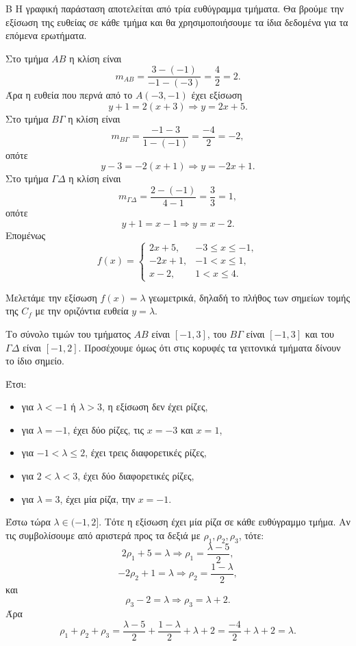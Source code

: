 
\begin{thema}{Β}
Η γραφική παράσταση αποτελείται από τρία ευθύγραμμα τμήματα. Θα βρούμε την εξίσωση της ευθείας σε κάθε τμήμα και θα χρησιμοποιήσουμε τα ίδια δεδομένα για τα επόμενα ερωτήματα.

\begin{erwthma}
\item Στο τμήμα $AB$ η κλίση είναι
\[
m_{AB}=\frac{3-(-1)}{-1-(-3)}=\frac{4}{2}=2.
\]
Άρα η ευθεία που περνά από το $A(-3,-1)$ έχει εξίσωση
\[
y+1=2(x+3)\Rightarrow y=2x+5.
\]
Στο τμήμα $B\Gamma$ η κλίση είναι
\[
m_{B\Gamma}=\frac{-1-3}{1-(-1)}=\frac{-4}{2}=-2,
\]
οπότε
\[
y-3=-2(x+1)\Rightarrow y=-2x+1.
\]
Στο τμήμα $\Gamma\Delta$ η κλίση είναι
\[
m_{\Gamma\Delta}=\frac{2-(-1)}{4-1}=\frac{3}{3}=1,
\]
οπότε
\[
y+1=x-1\Rightarrow y=x-2.
\]
Επομένως
\[
f(x)=
\begin{cases}
2x+5, & -3\leq x\leq -1,\\
-2x+1, & -1<x\leq 1,\\
x-2, & 1<x\leq 4.
\end{cases}
\]

\item Μελετάμε την εξίσωση $f(x)=\lambda$ γεωμετρικά, δηλαδή το πλήθος των σημείων τομής της $C_f$ με την οριζόντια ευθεία $y=\lambda$.

Το σύνολο τιμών του τμήματος $AB$ είναι $[-1,3]$, του $B\Gamma$ είναι $[-1,3]$ και του $\Gamma\Delta$ είναι $[-1,2]$. Προσέχουμε όμως ότι στις κορυφές τα γειτονικά τμήματα δίνουν το ίδιο σημείο.

Έτσι:
\begin{itemize}
\item για $\lambda<-1$ ή $\lambda>3$, η εξίσωση δεν έχει ρίζες,
\item για $\lambda=-1$, έχει δύο ρίζες, τις $x=-3$ και $x=1$,
\item για $-1<\lambda\leq 2$, έχει τρεις διαφορετικές ρίζες,
\item για $2<\lambda<3$, έχει δύο διαφορετικές ρίζες,
\item για $\lambda=3$, έχει μία ρίζα, την $x=-1$.
\end{itemize}

Έστω τώρα $\lambda\in(-1,2]$. Τότε η εξίσωση έχει μία ρίζα σε κάθε ευθύγραμμο τμήμα. Αν τις συμβολίσουμε από αριστερά προς τα δεξιά με $\rho_1,\rho_2,\rho_3$, τότε:
\[
2\rho_1+5=\lambda\Rightarrow \rho_1=\frac{\lambda-5}{2},
\]
\[
-2\rho_2+1=\lambda\Rightarrow \rho_2=\frac{1-\lambda}{2},
\]
και
\[
\rho_3-2=\lambda\Rightarrow \rho_3=\lambda+2.
\]
Άρα
\[
\rho_1+\rho_2+\rho_3
=\frac{\lambda-5}{2}+\frac{1-\lambda}{2}+\lambda+2
=\frac{-4}{2}+\lambda+2
=\lambda.
\]


\end{erwthma}
\end{thema}
